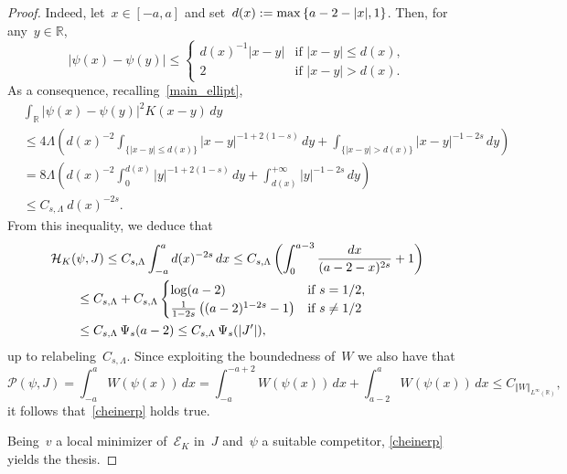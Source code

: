 \documentclass[10pt,a4paper]{amsart}
\numberwithin{equation}{section}
\newcommand{\R}{\mathbb{R}}
\newcommand{\Ec}{\mathcal{E}_K}
\newcommand{\Hc}{\mathcal{H}_K}
\newcommand{\Pc}{\mathcal{P}}
\begin{document}
\begin{proof}
Indeed, let~$x\in[-a,a]$ and set~$d(x):= {\rm max} \left\{ a-2-|x| , 1 \right\}$.
Then, for any~$y \in \R$,
\begin{equation*}|\psi(x)-\psi(y)| \leq
\begin{cases}
d(x)^{-1} | x-y| &\mbox{if } |x-y| \leq d(x), \\
2 &\mbox{if } |x-y| > d(x) .
\end{cases}
\end{equation*}
As a consequence, recalling~\eqref{main_ellipt},
\begin{equation*}
\begin{split}&
\int_{\R} |\psi(x)-\psi(y)|^2 K(x-y) \, dy \\
&\leq 4 \Lambda \left( d(x)^{-2} \int_{\{| x-y|\leq d(x)\}} |x-y |^{-1+2(1-s)} \, dy+  \int_{\{|x-y|> d(x)\}}|x-y |^{-1-2s} \, dy \right) \\
&=  8 \Lambda \left( d(x)^{-2} \int_{0}^{d(x)} |y |^{-1+2(1-s)} \, dy+ \int_{ d(x)}^{+\infty} |  y|^{-1-2s} \, dy \right) \\
&\leq C_{s,\Lambda} \ d(x)^{-2s}.
\end{split}
\end{equation*}
{F}rom this inequality, we deduce that
\begin{equation*}
\begin{split}
&\Hc(\psi,J ) \leq  C_{s,\Lambda} \int_{-a}^{a} d(x)^{-2s} \, dx \le C_{s,\Lambda} \left( \int_0^{a-3} \frac{dx}{(a-2-x)^{2s}}  + 1 \right) \\
&\qquad\le C_{s,\Lambda} +C_{s,\Lambda} \begin{cases}
\log(a-2) &\mbox{if } s =1/2,\\
\frac{1}{1-2s} \left( ( a -2 )^{1-2s}-1 \right) &\mbox{if } s\neq 1/2
\end{cases}\\
&\qquad \leq C_{s,\Lambda} \,\Psi_s(a-2) \leq C_{s,\Lambda}  \,\Psi_s(|J\rq{} |),
\end{split}
\end{equation*}
up to relabeling~$C_{s,\Lambda}$. Since
exploiting the boundedness of~$W$ we also have that
\begin{equation*}
\Pc(\psi,J ) = \int_{-a}^a W(\psi(x))\, dx =
\int_{-a}^{-a+2}W(\psi(x))\, dx +\int_{a-2}^{a}W(\psi(x))\, dx \leq C_{\Vert W \Vert_{L^{\infty}(\R)}},
\end{equation*}
it follows that~\eqref{cheinerp} holds true.

Being~$v$ a local minimizer of~$\Ec$ in~$J$ and~$\psi$ a suitable competitor, \eqref{cheinerp} yields the thesis.
\end{proof}
\end{document}
